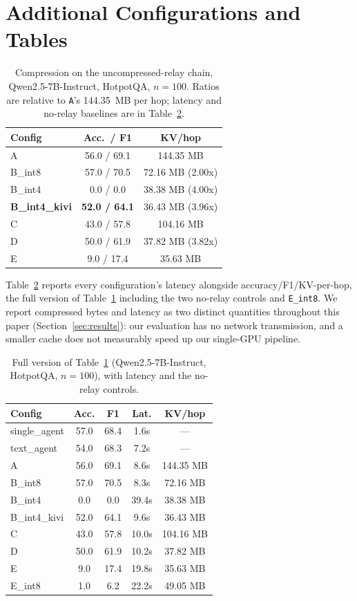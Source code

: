 \documentclass[11pt]{article}
\begin{document}
\section{Additional Configurations and Tables}
\label{app:extratables}

\begin{table}[h]
\centering
\small
\caption{Compression on the uncompressed-relay chain, Qwen2.5-7B-Instruct,
HotpotQA, $n{=}100$. Ratios are relative to \texttt{A}'s 144.35~MB per hop;
latency and no-relay baselines are in Table~\ref{tab:full}.}
\label{tab:main}
\begin{tabular}{lcc}
\toprule
\textbf{Config} & \textbf{Acc.\ / F1} & \textbf{KV/hop} \\
\midrule
A & 56.0 / 69.1 & 144.35 MB \\
B\_int8 & 57.0 / 70.5 & 72.16 MB (2.00x) \\
B\_int4 & 0.0 / 0.0 & 38.38 MB (4.00x) \\
\textbf{B\_int4\_kivi} & \textbf{52.0 / 64.1} & 36.43 MB (3.96x) \\
C & 43.0 / 57.8 & 104.16 MB \\
D & 50.0 / 61.9 & 37.82 MB (3.82x) \\
E & 9.0 / 17.4 & 35.63 MB \\
\bottomrule
\end{tabular}
\end{table}

Table~\ref{tab:full} reports every configuration's latency alongside
accuracy/F1/KV-per-hop, the full version of Table~\ref{tab:main}
including the two no-relay controls and \texttt{E\_int8}. We report
compressed bytes and latency as two distinct quantities throughout this
paper (Section~\ref{sec:results}): our evaluation has no network
transmission, and a smaller cache does not measurably speed up our
single-GPU pipeline.

\begin{table}[h]
\centering
\small
\begin{tabular}{lcccc}
\toprule
\textbf{Config} & \textbf{Acc.} & \textbf{F1} & \textbf{Lat.} & \textbf{KV/hop} \\
\midrule
single\_agent & 57.0 & 68.4 & 1.6s & --- \\
text\_agent & 54.0 & 68.3 & 7.2s & --- \\
A & 56.0 & 69.1 & 8.6s & 144.35 MB \\
B\_int8 & 57.0 & 70.5 & 8.3s & 72.16 MB \\
B\_int4 & 0.0 & 0.0 & 39.4s & 38.38 MB \\
B\_int4\_kivi & 52.0 & 64.1 & 9.6s & 36.43 MB \\
C & 43.0 & 57.8 & 10.0s & 104.16 MB \\
D & 50.0 & 61.9 & 10.2s & 37.82 MB \\
E & 9.0 & 17.4 & 19.8s & 35.63 MB \\
E\_int8 & 1.0 & 6.2 & 22.2s & 49.05 MB \\
\bottomrule
\end{tabular}
\caption{Full version of Table~\ref{tab:main} (Qwen2.5-7B-Instruct,
HotpotQA, $n=100$), with latency and the no-relay controls.}
\label{tab:full}
\end{table}
\end{document}
